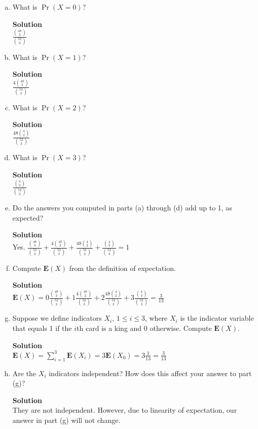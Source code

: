\documentclass[11pt]{article}
\newenvironment{Answer}{\vspace{10pt}\begin{mdframed}\textbf{Solution}\\}{\end{mdframed}\vfill\pagebreak[3]}
\newenvironment{Answer}{\vspace{10pt}}{\vfill\pagebreak[3]}
\newcommand*{\E}{\textbf{E}}
\begin{document}
\begin{enumerate}[(a)]
    \item What is $\Pr(X = 0)$?
    \begin{Answer}
    $\frac{\binom{48}{3}}{\binom{52}{3}}$
    \end{Answer}

    \item What is $\Pr(X = 1)$?
    \begin{Answer}
    $\frac{4\binom{48}{2}}{\binom{52}{3}}$
    \end{Answer}

    \item What is $\Pr(X = 2)$?
    \begin{Answer}
    $\frac{48\binom{4}{2}}{\binom{52}{3}}$
    \end{Answer}

    \item What is $\Pr(X = 3)$?
    \begin{Answer}
    $\frac{\binom{4}{3}}{\binom{52}{3}}$
    \end{Answer}

    \item Do the answers you computed in parts (a) through (d) add up to 1, as expected?
    \begin{Answer}
    Yes. $\frac{\binom{48}{3}}{\binom{52}{3}}+\frac{4\binom{48}{2}}{\binom{52}{3}}+\frac{48\binom{4}{2}}{\binom{52}{3}}+\frac{\binom{4}{3}}{\binom{52}{3}}=1$
    
    \end{Answer}

    \item Compute $\E(X)$ from the definition of expectation.
    \begin{Answer}
    $\E(X)=0\frac{\binom{48}{3}}{\binom{52}{3}}+1\frac{4\binom{48}{2}}{\binom{52}{3}}+2\frac{48\binom{4}{2}}{\binom{52}{3}}+3\frac{\binom{4}{3}}{\binom{52}{3}}=\frac{3}{13}$
    \end{Answer}

    \item Suppose we define indicators $X_i$, $1 \leq i \leq 3$, where $X_i$ is the indicator variable that equals 1 if the $i$th card is a king and 0 otherwise. Compute $\E(X)$.
    \begin{Answer}
    $\E(X)=\sum_{i=1}^3 \E(X_i)=3\E(X_0)=3\frac{1}{13}=\frac{3}{13}$
    \end{Answer}

    \item Are the $X_i$ indicators independent? How does this affect your answer to part (g)?
    \begin{Answer}
    They are not independent. However, due to linearity of expectation, our answer in part (g) will not change.
    \end{Answer}
\end{enumerate}
\end{document}
